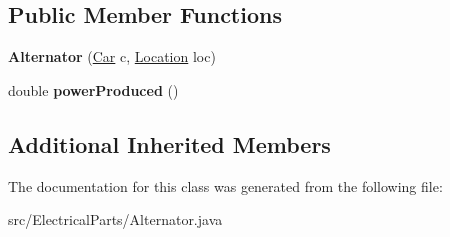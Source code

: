 \subsection*{Public Member Functions}
\begin{DoxyCompactItemize}
\item 
\hypertarget{classElectricalParts_1_1Alternator_a5ae0780e8c5f063ab85b3bde24c3623b}{}{\bfseries Alternator} (\hyperlink{classCars_1_1Car}{Car} c, \hyperlink{enumEnums_1_1Location}{Location} loc)\label{classElectricalParts_1_1Alternator_a5ae0780e8c5f063ab85b3bde24c3623b}

\item 
\hypertarget{classElectricalParts_1_1Alternator_ad4c99aba0686e4a386d3232884a023c3}{}double {\bfseries power\+Produced} ()\label{classElectricalParts_1_1Alternator_ad4c99aba0686e4a386d3232884a023c3}

\end{DoxyCompactItemize}
\subsection*{Additional Inherited Members}


The documentation for this class was generated from the following file\+:\begin{DoxyCompactItemize}
\item 
src/\+Electrical\+Parts/Alternator.\+java\end{DoxyCompactItemize}
